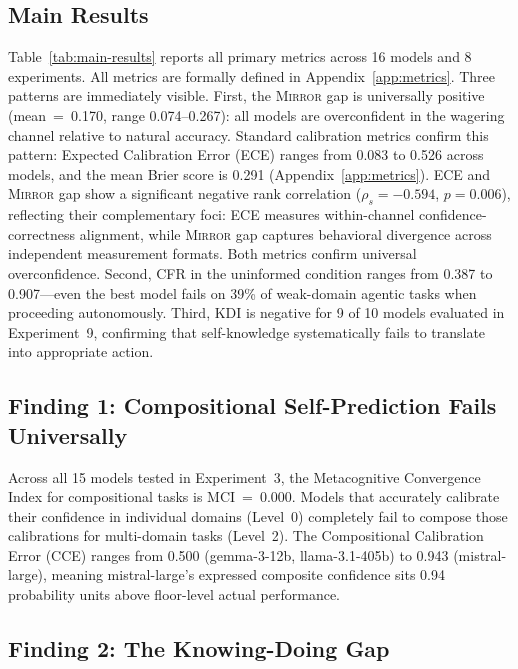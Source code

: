 \documentclass[10pt]{article}
\newcommand{\mirror}{\textsc{Mirror}}
\newcommand{\MCI}{MCI}
\newcommand{\CCE}{CCE}
\newcommand{\KDI}{KDI}
\newcommand{\CFR}{CFR}
\begin{document}
\subsection{Main Results}

Table~\ref{tab:main-results} reports all primary metrics across 16 models and 8
experiments. All metrics are formally defined in Appendix~\ref{app:metrics}. Three patterns are immediately visible. First, the \mirror{} gap is
universally positive (mean~=~0.170, range 0.074--0.267): all models are
overconfident in the wagering channel relative to natural accuracy.
Standard calibration metrics confirm this pattern: Expected Calibration Error (ECE)
ranges from 0.083 to 0.526 across models, and the mean Brier score is 0.291
(Appendix~\ref{app:metrics}). ECE and \mirror{} gap show a significant negative
rank correlation ($\rho_s = -0.594$, $p = 0.006$), reflecting their
complementary foci: ECE measures within-channel confidence-correctness alignment,
while \mirror{} gap captures behavioral divergence across independent measurement
formats. Both metrics confirm universal overconfidence. Second, \CFR{}
in the uninformed condition ranges from 0.387 to 0.907---even the best model fails
on 39\% of weak-domain agentic tasks when proceeding autonomously. Third, \KDI{}
is negative for 9 of 10 models evaluated in Experiment~9, confirming that
self-knowledge systematically fails to translate into appropriate action.



\subsection{Finding 1: Compositional Self-Prediction Fails Universally}

Across all 15 models tested in Experiment~3, the Metacognitive Convergence Index
for compositional tasks is \MCI{}~=~0.000. Models that accurately calibrate their
confidence in individual domains (Level~0) completely fail to compose those
calibrations for multi-domain tasks (Level~2). The Compositional Calibration Error (\CCE{}) ranges from 0.500 (gemma-3-12b,
llama-3.1-405b) to 0.943 (mistral-large), meaning mistral-large's expressed
composite confidence sits 0.94 probability units above floor-level actual
performance.

\subsection{Finding 2: The Knowing-Doing Gap}
\end{document}
